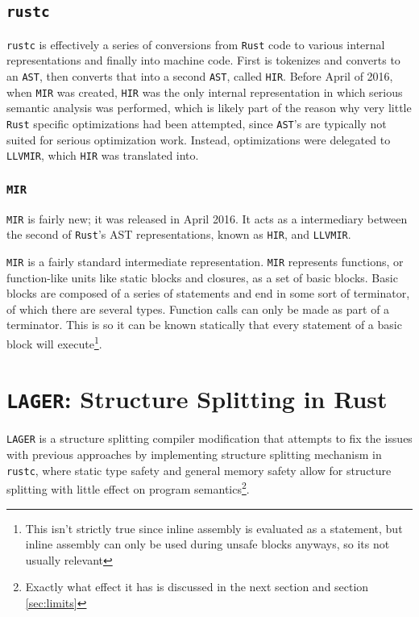 \documentclass[12pt,oneside]{book}
\newcommand{\rustname}{{\texttt{Rust}}}
\def \rust {\rustname{}\xspace}
\newcommand{\rustcname}{{\texttt{rustc}}}
\def \rustc {\rustcname{}\xspace}
\newcommand{\mirname}{{\texttt{MIR}}}
\def \mir {\mirname{}\xspace}
\newcommand{\hirname}{{\texttt{HIR}}}
\def \hir {\hirname{}\xspace}
\newcommand{\llvmirname}{{\texttt{LLVMIR}}}
\def \llvmir {\llvmirname{}\xspace}
\newcommand{\projectname}{{\texttt{LAGER}}}
\def \name{\projectname\xspace}
\begin{document}
\section{\rustc}
\label{sec:rustc}

\rustc is effectively a series of conversions from
\rust code to various internal representations and finally into machine code.
First is tokenizes and converts to an \texttt{AST}, then converts that into a
second \texttt{AST}, called \hir. Before April of 2016, when \mir was created,
\hir was the only
internal representation in which serious semantic analysis was performed, which
is likely part of the reason why very little \rust specific optimizations had
been attempted, since \texttt{AST}'s are typically not suited for serious
optimization work. Instead, optimizations were delegated to \llvmir, which \hir
was translated into. 


\subsection{\mir}
\mir is fairly new; it was released in April 2016\cite{mirintro}. It acts as a
intermediary between the second of \rust's AST representations, known as \hir,
and \llvmir.

\mir is a fairly standard intermediate representation. \mir represents functions, 
or function-like units like static blocks and closures, 
as a set of basic blocks. Basic blocks are composed of a series of statements
and end in some sort of terminator, of which there are several types. 
Function calls can only be made as part of a terminator. This is
so it can be known statically that every statement of a basic block will
execute\footnote{This isn't strictly true since inline assembly is evaluated as
  a statement, but inline assembly can only be used during unsafe blocks
  anyways, so its not usually relevant}.
  

\chapter{\name: Structure Splitting in Rust}

\name is a structure splitting compiler modification that attempts to fix the issues with
previous approaches by implementing structure splitting mechanism in \rustc, where static type
safety and general memory safety allow for structure splitting with little effect on program
semantics\footnote{Exactly what effect it has is discussed in the next section and section \ref{sec:limits}}.
\end{document}
